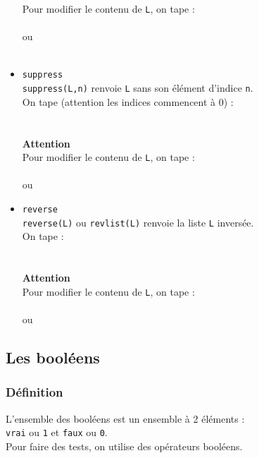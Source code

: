 \documentclass[12pt,a4paper]{book}
\begin{document}
\begin{giacjshere}
\begin{itemize}
Pour modifier le contenu de {\tt L}, on tape :\\
\\
ou\\
\\
\item
{\tt suppress}\\
{\tt suppress(L,n)} renvoie {\tt L} sans son \'el\'ement d'indice 
{\tt n}.\\
On tape (attention les indices commencent \`a 0) :\\
\\
\\
{\bf Attention}\\
Pour modifier le contenu de {\tt L}, on tape :\\
\\
ou\\
\item
{\tt reverse}\\
{\tt reverse(L)} ou {\tt revlist(L)} renvoie la liste {\tt L} invers\'ee.\\
On tape :\\
\\
\\
{\bf Attention}\\
Pour modifier le contenu de {\tt L}, on tape :\\
\\
ou\\
\end{itemize}

\subsection{Les bool\'eens}
\subsubsection{D\'efinition}
L'ensemble des bool\'eens est un ensemble \`a 2 \'el\'ements :\\
{\tt vrai} ou {\tt 1} et {\tt faux} ou {\tt 0}.\\
Pour faire des tests, on utilise des op\'erateurs bool\'eens.


\end{giacjshere}
\end{document}
